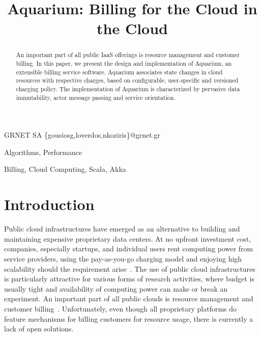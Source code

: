 \documentclass[preprint,10pt]{sigplanconf}
\begin{document}




\title{Aquarium: Billing for the Cloud in the Cloud}

{GRNET SA}
{\{gousiosg,loverdos,nkoziris\}@grnet.gr}

\maketitle
\begin{abstract}

An important part of all public IaaS offerings is resource management and
customer billing. In this paper, we present the design and implementation of
Aquarium, an extensible billing service software. Aquarium associates state
changes in cloud resources with respective charges, based on configurable,
user-specific and versioned charging policy. The implementation of Aquarium is
characterized by pervasive data immutability, actor message passing and service
orientation.  

\end{abstract}


\terms
    Algorithms, Performance

\keywords
    Billing, Cloud Computing, Scala, Akka

\section{Introduction}

Public cloud infrastructures have emerged as an alternative to building and
maintaining expensive proprietary data centers. At no upfront investment cost,
companies, especially startups, and individual users rent computing power from
service providers, using the pay-as-you-go charging model and enjoying high
scalability should the requirement arise~\cite{Lourid10}. The use of public cloud
infrastructures is particularly attractive for various forms of research
activities, where budget is usually tight and availability of computing power
can make or break an experiment. An important part of all public clouds is
resource management and customer billing~\cite{Armbr10}. Unfortunately, even
though all proprietary platforms do feature mechanisms for billing customers
for resource usage, there is currently a lack of open solutions.
\end{document}
